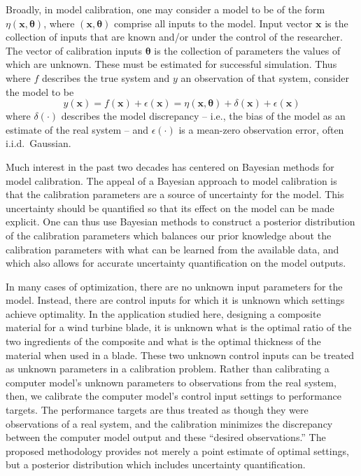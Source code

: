 \documentclass{article}
\begin{document}
Broadly, in model calibration, one may consider a model to be of the form $\eta(\mathbf x,\boldsymbol \theta)$, where $(\mathbf x,\boldsymbol \theta)$ comprise all inputs to the model. 
%
Input vector $\mathbf x$ is the collection of inputs that are known and/or under the control of the researcher.
%
The vector of calibration inputs $\boldsymbol \theta$ is the collection of parameters the values of which are unknown. 
%
These must be estimated for successful simulation. 
%
Thus where $f$ describes the true system and $y$ an observation of that system, consider the model to be 
%
\begin{equation} \label{eq:model_gen}
y(\mathbf x)=f(\mathbf x)+\epsilon(\mathbf x)=\eta(\mathbf x,\boldsymbol \theta) + \delta(\mathbf x)+\epsilon(\mathbf x)
\end{equation} 
%
where $\delta(\cdot)$ describes the model discrepancy -- i.e., the bias of the model as an estimate of the real system -- and $\epsilon(\cdot)$ is a mean-zero observation error, often i.i.d.\ Gaussian. 
%
%

Much interest in the past two decades has centered on Bayesian methods for model calibration. 
%
The appeal of a Bayesian approach to model calibration is that the calibration parameters are a source of uncertainty for the model. 
%
This uncertainty should be quantified so that its effect on the model can be made explicit. 
%
One can thus use Bayesian methods to construct a posterior distribution of the calibration parameters which balances our prior knowledge about the calibration parameters with what can be learned from the available data, and which also allows for accurate uncertainty quantification on the model outputs. 

In many cases of optimization, there are no unknown input parameters for the model. 
%
Instead, there are control inputs for which it is unknown which settings achieve optimality.
%
In the application studied here, designing a composite material for a wind turbine blade, it is unknown what is the optimal ratio of the two ingredients of the composite and what is the optimal thickness of the material when used in a blade.
%
These two unknown control inputs can be treated as unknown parameters in a calibration problem.
%
Rather than calibrating a computer model's unknown parameters to observations from the real system, then, we calibrate the computer model's control input settings to performance targets.
%
The performance targets are thus treated as though they were observations of a real system, and the calibration minimizes the discrepancy between the computer model output and these ``desired observations.''
%
The proposed methodology provides not merely a point estimate of optimal settings, but a posterior distribution which includes uncertainty quantification.
\end{document}
